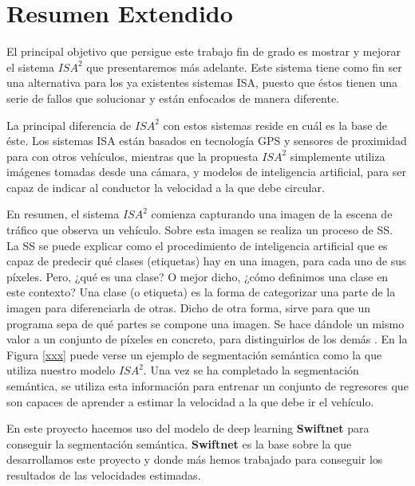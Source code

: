 \chapter{Resumen Extendido}

El principal objetivo que persigue este trabajo fin de grado es mostrar y mejorar el sistema $ISA^{2}$ que presentaremos más adelante. Este sistema tiene como fin ser una alternativa para los ya existentes sistemas \ac{ISA}, puesto que éstos tienen una serie de fallos que solucionar y están enfocados de manera diferente.

La principal diferencia de $ISA^{2}$ con estos sistemas reside en cuál es la base de éste. Los sistemas \ac{ISA} están basados en tecnología \ac{GPS} y sensores de proximidad para con otros vehículos, mientras que la propuesta $ISA^{2}$ simplemente utiliza imágenes tomadas desde una cámara, y modelos de inteligencia artificial, para ser capaz de indicar al conductor la velocidad a la que debe circular.

En resumen, el sistema $ISA^{2}$ comienza capturando una imagen de la escena de tráfico que observa un vehículo. Sobre esta imagen se realiza un proceso de \ac{SS}. La \ac{SS} se puede explicar como el procedimiento de inteligencia artificial que es capaz de predecir qué clases (etiquetas) hay en una imagen, para cada uno de sus píxeles. Pero, ¿qué es una clase? O mejor dicho, ¿cómo definimos una clase en este contexto? Una clase (o etiqueta) es la forma de categorizar una parte de la imagen para diferenciarla de otras. Dicho de otra forma, sirve para que un programa sepa de qué partes se compone una imagen. Se hace dándole un mismo valor a un conjunto de píxeles en concreto, para distinguirlos de los demás \cite{deeplab}. En la Figura \ref{xxx} puede verse un ejemplo de segmentación semántica como la que utiliza nuestro modelo $ISA^{2}$. Una vez se ha completado la segmentación semántica, se utiliza esta información para entrenar un conjunto de regresores que son capaces de aprender a estimar la velocidad a la que debe ir el vehículo.

En este proyecto hacemos uso del modelo de deep learning \textbf{Swiftnet} \cite{swiftnet} para conseguir la segmentación semántica. \textbf{Swiftnet} es la base sobre la que desarrollamos este proyecto y donde más hemos trabajado para conseguir los resultados de las velocidades estimadas.

